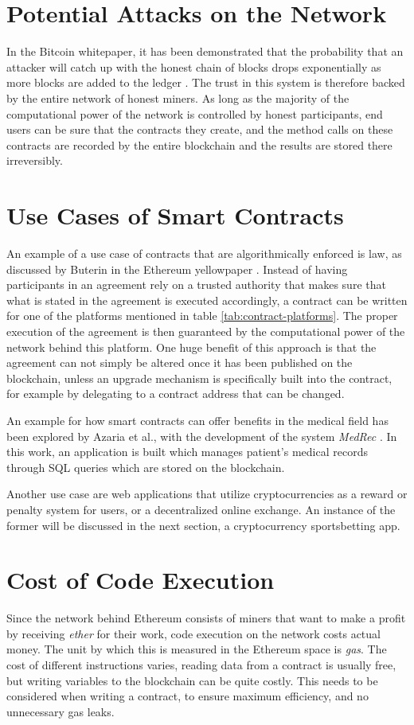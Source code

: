 \section*{Potential Attacks on the Network}
In the Bitcoin whitepaper, it has been demonstrated that the probability that an attacker will catch up with the honest chain of blocks drops exponentially as more blocks are added to the ledger \cite[p.~7]{Nakamoto2009}. The trust in this system is therefore backed by the entire network of honest miners. 
\newpage
As long as the majority of the computational power of the network is controlled by honest participants, end users can be sure that the contracts they create, and the method calls on these contracts are recorded by the entire blockchain and the results are stored there irreversibly.
\section*{Use Cases of Smart Contracts}
An example of a use case of contracts that are algorithmically enforced is law, as discussed by Buterin in the Ethereum yellowpaper \cite[p.~2]{Buterin2013}. Instead of having participants in an agreement rely on a trusted authority that makes sure that what is stated in the agreement is executed accordingly, a contract can be written for one of the platforms mentioned in table \ref{tab:contract-platforms}. The proper execution of the agreement is then guaranteed by the computational power of the network behind this platform. One huge benefit of this approach is that the agreement can not simply be altered once it has been published on the blockchain, unless an upgrade mechanism is specifically built into the contract, for example by delegating to a contract address that can be changed.

An example for how smart contracts can offer benefits in the medical field has been explored by Azaria et al., with the development of the system \emph{MedRec} \cite{azaria2016medrec}. In this work, an application is built which manages patient's medical records through SQL queries which are stored on the blockchain. 

Another use case are web applications that utilize cryptocurrencies as a reward or penalty system for users, or a decentralized online exchange. An instance of the former will be discussed in the next section, a cryptocurrency sportsbetting app.
\section*{Cost of Code Execution}
Since the network behind Ethereum consists of miners that want to make a profit by receiving \emph{ether} for their work, code execution on the network costs actual money. The unit by which this is measured in the Ethereum space is \emph{gas}. The cost of different instructions varies, reading data from a contract is usually free, but writing variables to the blockchain can be quite costly. This needs to be considered when writing a contract, to ensure maximum efficiency, and no unnecessary gas leaks.

